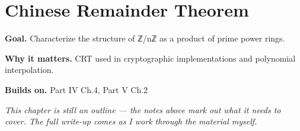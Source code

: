 \chapter{Chinese Remainder Theorem}
\label{ch:05-number-theory-04}

\begin{chapterintro}
\textbf{Goal.} Characterize the structure of ℤ/nℤ as a product of prime power rings.

\textbf{Why it matters.} CRT used in cryptographic implementations and polynomial interpolation.

\textbf{Builds on.} Part IV Ch.4, Part V Ch.2
\end{chapterintro}

\textit{This chapter is still an outline --- the notes above mark out what it needs to cover. The full write-up comes as I work through the material myself.}
